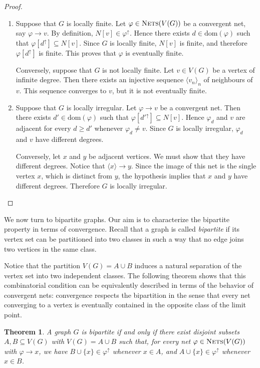 \documentclass{amsart}
\newtheorem{theorem}{Theorem}[section]
\theoremstyle{definition}
\theoremstyle{remark}
\numberwithin{equation}{section}
\begin{document}
\begin{proof}
	\text{}
\begin{enumerate}
	\item Suppose that $G$ is locally finite. Let $\varphi\in \textsc{Nets}(V(G))$ be a convergent net, say $\varphi \to v$. By definition, $N[v]\in \varphi^{\uparrow}$. Hence there exists $d\in \mathrm{dom}(\varphi)$ such that $\varphi[d^\uparrow]\subseteq N[v]$. Since $G$ is locally finite, $N[v]$ is finite, and therefore $\varphi[d^\uparrow]$ is finite. This proves that $\varphi$ is eventually finite.
	
	Conversely, suppose that $G$ is not locally finite. Let $v\in V(G)$ be a vertex of infinite degree. Then there exists an injective sequence $\langle v_n\rangle_{n}$ of neighbours of $v$. This sequence converges to $v$, but it is not eventually finite.
	
	\item Suppose that $G$ is locally irregular. Let $\varphi\to v$ be a convergent net. Then there exists $d'\in \mathrm{dom}(\varphi)$ such that $\varphi[d'^\uparrow]\subseteq N[v]$. Hence $\varphi_d$ and $v$ are adjacent for every $d\ge d'$ whenever $\varphi_d\neq v$. Since $G$ is locally irregular, $\varphi_d$ and $v$ have different degrees.
	
	Conversely, let $x$ and $y$ be adjacent vertices. We must show that they have different degrees. Notice that $\langle x\rangle\to y$. Since the image of this net is the single vertex $x$, which is distinct from $y$, the hypothesis implies that $x$ and $y$ have different degrees. Therefore $G$ is locally irregular.
\end{enumerate}
\end{proof}


We now turn to bipartite graphs. Our aim is to characterize the bipartite property in terms of convergence. Recall that a graph is called \emph{bipartite} if its vertex set can be partitioned into two classes in such a way that no edge joins two vertices in the same class.

Notice that the partition $V(G)=A\cup B$ induces a natural separation of the vertex set into two independent classes. The following theorem shows that this combinatorial condition can be equivalently described in terms of the behavior of convergent nets: convergence respects the bipartition in the sense that every net converging to a vertex is eventually contained in the opposite class of the limit point.

\begin{theorem}
	\label{bipartite}
	A graph $G$ is bipartite if and only if there exist disjoint subsets 
	$A,B\subseteq V(G)$ with $V(G)=A\cup B$ such that, for every net 
	$\varphi\in\textsc{Nets}(V(G))$ with $\varphi\to x$, we have 
	$B\cup\{x\}\in\varphi^\uparrow$ whenever $x\in A$, and 
	$A\cup\{x\}\in\varphi^\uparrow$ whenever $x\in B$.
\end{theorem}
\end{document}
